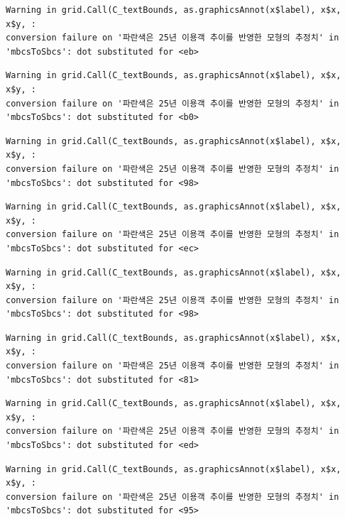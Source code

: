 \documentclass[
  letterpaper,
  DIV=11,
  numbers=noendperiod]{scrreprt}
\begin{document}
\begin{verbatim}
Warning in grid.Call(C_textBounds, as.graphicsAnnot(x$label), x$x, x$y, :
conversion failure on '파란색은 25년 이용객 추이를 반영한 모형의 추정치' in
'mbcsToSbcs': dot substituted for <eb>
\end{verbatim}

\begin{verbatim}
Warning in grid.Call(C_textBounds, as.graphicsAnnot(x$label), x$x, x$y, :
conversion failure on '파란색은 25년 이용객 추이를 반영한 모형의 추정치' in
'mbcsToSbcs': dot substituted for <b0>
\end{verbatim}

\begin{verbatim}
Warning in grid.Call(C_textBounds, as.graphicsAnnot(x$label), x$x, x$y, :
conversion failure on '파란색은 25년 이용객 추이를 반영한 모형의 추정치' in
'mbcsToSbcs': dot substituted for <98>
\end{verbatim}

\begin{verbatim}
Warning in grid.Call(C_textBounds, as.graphicsAnnot(x$label), x$x, x$y, :
conversion failure on '파란색은 25년 이용객 추이를 반영한 모형의 추정치' in
'mbcsToSbcs': dot substituted for <ec>
\end{verbatim}

\begin{verbatim}
Warning in grid.Call(C_textBounds, as.graphicsAnnot(x$label), x$x, x$y, :
conversion failure on '파란색은 25년 이용객 추이를 반영한 모형의 추정치' in
'mbcsToSbcs': dot substituted for <98>
\end{verbatim}

\begin{verbatim}
Warning in grid.Call(C_textBounds, as.graphicsAnnot(x$label), x$x, x$y, :
conversion failure on '파란색은 25년 이용객 추이를 반영한 모형의 추정치' in
'mbcsToSbcs': dot substituted for <81>
\end{verbatim}

\begin{verbatim}
Warning in grid.Call(C_textBounds, as.graphicsAnnot(x$label), x$x, x$y, :
conversion failure on '파란색은 25년 이용객 추이를 반영한 모형의 추정치' in
'mbcsToSbcs': dot substituted for <ed>
\end{verbatim}

\begin{verbatim}
Warning in grid.Call(C_textBounds, as.graphicsAnnot(x$label), x$x, x$y, :
conversion failure on '파란색은 25년 이용객 추이를 반영한 모형의 추정치' in
'mbcsToSbcs': dot substituted for <95>
\end{verbatim}
\end{document}

